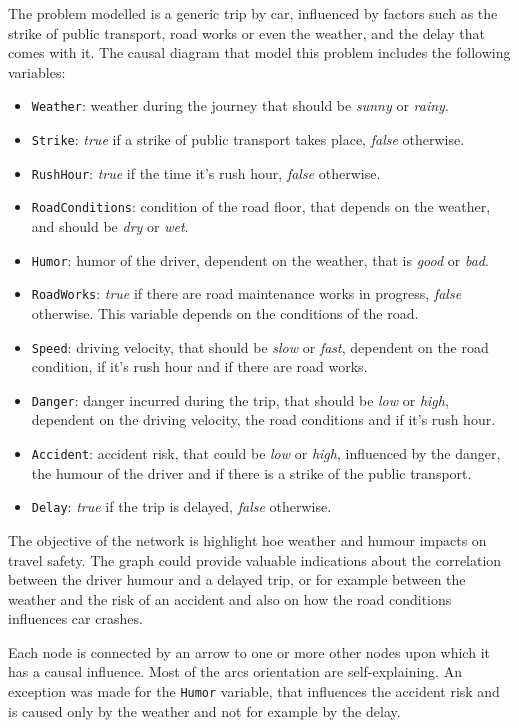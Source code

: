 \documentclass[a4paper,12pt]{article} %
\begin{document}
The problem modelled is a generic trip by car, influenced by factors such as the strike of public transport, road works or even the weather, and the delay that comes with it. 
The causal diagram that model this problem includes the following variables:
\begin{itemize}
	\item \texttt{Weather}: weather during the journey that should be \textit{sunny} or \textit{rainy}.
	\item \texttt{Strike}: \textit{true} if a strike of public transport takes place, \textit{false} otherwise.
	\item \texttt{RushHour}: \textit{true} if the time it’s rush hour, \textit{false} otherwise.
	\item \texttt{RoadConditions}: condition of the road floor, that depends on the weather, and should be \textit{dry} or \textit{wet}.
	\item \texttt{Humor}: humor of the driver, dependent on the weather, that is \textit{good} or \textit{bad}.
	\item \texttt{RoadWorks}: \textit{true} if there are road maintenance works in progress, \textit{false} otherwise. This variable depends on the conditions of the road.
	\item \texttt{Speed}: driving velocity, that should be \textit{slow} or \textit{fast}, dependent on the road condition, if it’s rush hour and if there are road works.
	\item \texttt{Danger}: danger incurred during the trip, that should be \textit{low} or \textit{high}, dependent on the driving velocity, the road conditions and if it’s rush hour.
	\item \texttt{Accident}: accident risk, that could be \textit{low} or \textit{high}, influenced by the danger, the humour of the driver and if there is a strike of the public transport.
	\item \texttt{Delay}: \textit{true} if the trip is delayed, \textit{false} otherwise.
\end{itemize}

The objective of the network is highlight hoe weather and humour impacts on travel safety. 
The graph could provide valuable indications about the correlation between the driver humour and a delayed trip, or for example between the weather and the risk of an accident and also on how the road conditions influences car crashes.

Each node is connected by an arrow to one or more other nodes upon which it has a causal influence. Most of the arcs orientation are self-explaining. An exception was made for the \texttt{Humor} variable, that influences the accident risk and is caused only by the weather and not for example by the delay. 
\end{document}
